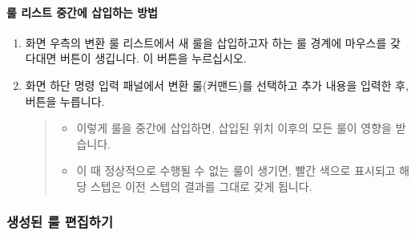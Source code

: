 \documentclass[letterpaper,10pt,english]{sphinxmanual}
\begin{document}
\paragraph{룰 리스트 중간에 삽입하는 방법}
\label{\detokenize{discovery/part07/edit_rules:id5}}\begin{enumerate}
\def\theenumi{\arabic{enumi}}
\def\labelenumi{\theenumi .}
\makeatletter\def\p@enumii{\p@enumi \theenumi .}\makeatother
\item {} 
화면 우측의 변환 룰 리스트에서 새 룰을 삽입하고자 하는 룰 경계에 마우스를 갖다대면  버튼이 생깁니다. 이 버튼을 누르십시오.
\begin{quote}

\begin{figure}[H]
\centering

\noindent{}
\end{figure}
\end{quote}

\item {} 
화면 하단 명령 입력 패널에서 변환 룰(커맨드)를 선택하고 추가 내용을 입력한 후,  버튼을 누릅니다.
\begin{quote}
\begin{itemize}
\item {} 
이렇게 룰을 중간에 삽입하면, 삽입된 위치 이후의 모든 룰이 영향을 받습니다.

\item {} 
이 때 정상적으로 수행될 수 없는 룰이 생기면, 빨간 색으로 표시되고 해당 스텝은 이전 스텝의 결과를 그대로 갖게 됩니다.

\end{itemize}

\begin{figure}[H]
\centering

\noindent{}
\end{figure}
\end{quote}

\end{enumerate}


\subsubsection{생성된 룰 편집하기}
\label{\detokenize{discovery/part07/edit_rules:id6}}
\end{document}
